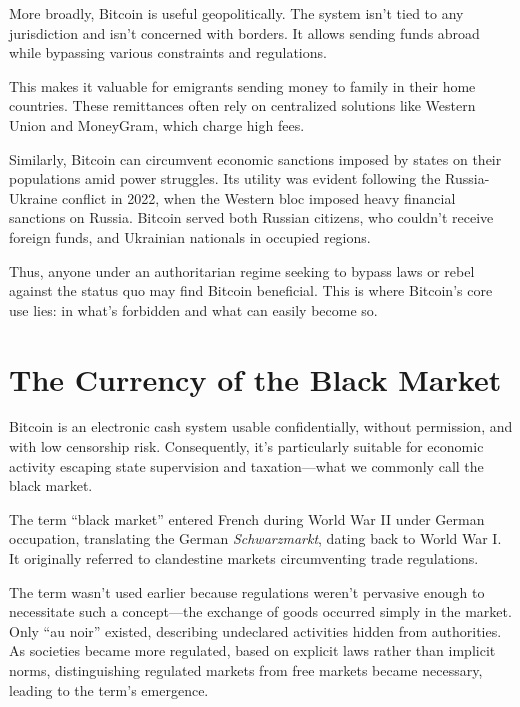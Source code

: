 \documentclass[
  a5paper,
  smalldemyvopaper,10pt,twoside,onecolumn,openright,extrafontsizes,hidelinks]{memoir}
\begin{document}
More broadly, Bitcoin is useful geopolitically. The system isn't tied to
any jurisdiction and isn't concerned with borders. It allows sending
funds abroad while bypassing various constraints and regulations.

This makes it valuable for emigrants sending money to family in their
home countries. These remittances often rely on centralized solutions
like Western Union and MoneyGram, which charge high fees.

Similarly, Bitcoin can circumvent economic sanctions imposed by states
on their populations amid power struggles. Its utility was evident
following the Russia-Ukraine conflict in 2022, when the Western bloc
imposed heavy financial sanctions on Russia. Bitcoin served both Russian
citizens, who couldn't receive foreign funds, and Ukrainian nationals in
occupied regions.

Thus, anyone under an authoritarian regime seeking to bypass laws or
rebel against the status quo may find Bitcoin beneficial. This is where
Bitcoin's core use lies: in what's forbidden and what can easily become
so.

\section*{The Currency of the Black
Market}\label{la-monnaie-du-marche-noir}


Bitcoin is an electronic cash system usable confidentially, without
permission, and with low censorship risk. Consequently, it's
particularly suitable for economic activity escaping state supervision
and taxation---what we commonly call the black market.

The term ``black market'' entered French during World War II under
German occupation, translating the German \emph{Schwarzmarkt}, dating
back to World War I. It originally referred to clandestine markets
circumventing trade regulations.

The term wasn't used earlier because regulations weren't pervasive
enough to necessitate such a concept---the exchange of goods occurred
simply in the market. Only ``au noir'' existed, describing undeclared
activities hidden from authorities. As societies became more regulated,
based on explicit laws rather than implicit norms, distinguishing
regulated markets from free markets became necessary, leading to the
term's emergence.
\end{document}
